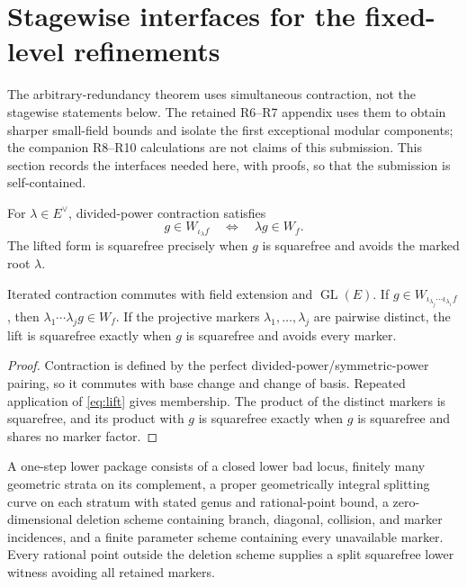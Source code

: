 \section{Stagewise interfaces for the fixed-level refinements}
\label{sec:polar}

The arbitrary-redundancy theorem uses simultaneous contraction, not the
stagewise statements below.  The retained R6--R7 appendix uses them to obtain
sharper small-field bounds and isolate the first exceptional modular
components; the companion R8--R10 calculations are not claims of this
submission.  This section records the interfaces needed here, with proofs, so
that the submission is self-contained.

For \(\lambda\in E^\vee\), divided-power contraction satisfies
\begin{equation}\label{eq:lift}
 g\in W_{\iota_\lambda f}\quad\Longleftrightarrow\quad
 \lambda g\in W_f.
\end{equation}
The lifted form is squarefree precisely when \(g\) is squarefree and avoids
the marked root \(\lambda\).

\begin{theorem}\label{thm:polar-construction}%
%
%
Iterated contraction commutes with field extension and
\(\operatorname{GL}(E)\).  If
\(g\in W_{\iota_{\lambda_j}\cdots\iota_{\lambda_1}f}\), then
\(\lambda_1\cdots\lambda_jg\in W_f\).  If the projective markers
\(\lambda_1,\ldots,\lambda_j\) are pairwise distinct, the lift is squarefree
exactly when \(g\) is squarefree and avoids every marker.
\end{theorem}

\begin{proof}
Contraction is defined by the perfect divided-power/symmetric-power pairing,
so it commutes with base change and change of basis.  Repeated application of
\eqref{eq:lift} gives membership.  The product of the distinct markers is
squarefree, and its product with \(g\) is squarefree exactly when \(g\) is
squarefree and shares no marker factor.
\end{proof}

\begin{definition}\label{def:lower-package}
A one-step lower package consists of a closed lower bad locus, finitely many
geometric strata on its complement, a proper geometrically integral splitting
curve on each stratum with stated genus and rational-point bound, a
zero-dimensional deletion scheme containing branch, diagonal, collision, and
marker incidences, and a finite parameter scheme containing every unavailable
marker.  Every rational point outside the deletion scheme supplies a split
squarefree lower witness avoiding all retained markers.
\end{definition}

